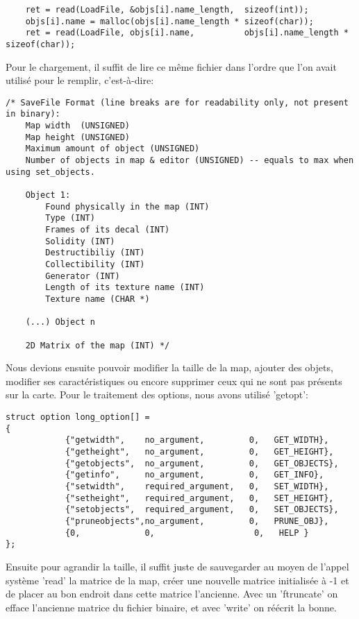 \documentclass[a4paper]{article}
\begin{document}
\begin{verbatim}
    ret = read(LoadFile, &objs[i].name_length,  sizeof(int));
    objs[i].name = malloc(objs[i].name_length * sizeof(char));
    ret = read(LoadFile, objs[i].name,          objs[i].name_length * sizeof(char));
\end{verbatim}   

Pour le chargement, il suffit de lire ce même fichier dans l'ordre que l'on avait utilisé pour le remplir, c'est-à-dire:

\begin{verbatim}
/* SaveFile Format (line breaks are for readability only, not present in binary):
    Map width  (UNSIGNED)
    Map height (UNSIGNED)
    Maximum amount of object (UNSIGNED)
    Number of objects in map & editor (UNSIGNED) -- equals to max when using set_objects.

    Object 1:
        Found physically in the map (INT)
        Type (INT)
        Frames of its decal (INT)
        Solidity (INT)
        Destructibiliy (INT)
        Collectibility (INT)
        Generator (INT)
        Length of its texture name (INT)
        Texture name (CHAR *)

    (...) Object n

    2D Matrix of the map (INT) */
\end{verbatim}

Nous devions ensuite pouvoir modifier la taille de la map, ajouter des objets, modifier ses caractéristiques ou encore supprimer ceux qui ne sont pas présents sur la carte.
Pour le traitement des options, nous avons utilisé 'getopt':

\begin{verbatim}
struct option long_option[] =
{
            {"getwidth",    no_argument,         0,   GET_WIDTH},
            {"getheight",   no_argument,         0,   GET_HEIGHT},
            {"getobjects",  no_argument,         0,   GET_OBJECTS},
            {"getinfo",     no_argument,         0,   GET_INFO},
            {"setwidth",    required_argument,   0,   SET_WIDTH},
            {"setheight",   required_argument,   0,   SET_HEIGHT}, 
            {"setobjects",  required_argument,   0,   SET_OBJECTS},
            {"pruneobjects",no_argument,         0,   PRUNE_OBJ},
            {0,             0,                    0,   HELP }
};
\end{verbatim} 


Ensuite pour agrandir la taille, il suffit juste de sauvegarder au moyen de l'appel système 'read' la matrice de la map, créer une nouvelle matrice initialisée à -1 et de placer au bon endroit dans cette matrice l'ancienne. Avec un 'ftruncate' on efface l'ancienne matrice du fichier binaire, et avec 'write' on réécrit la bonne.
\end{document}
